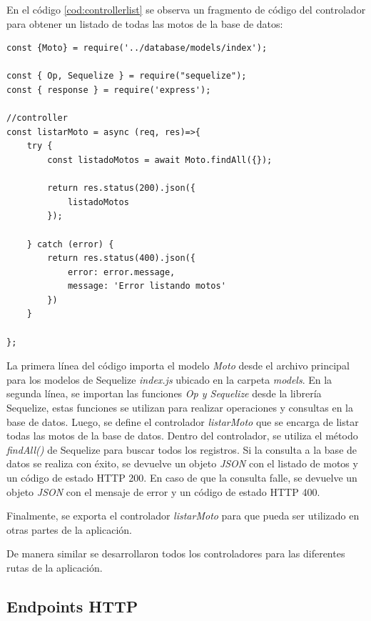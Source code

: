 En el código \ref{cod:controllerlist} se observa un fragmento de código del controlador para obtener un listado de todas las motos de la base de datos:

\begin{lstlisting}[label=cod:controllerlist,caption=Código de controlador para obtener listado de motos.]
const {Moto} = require('../database/models/index');

const { Op, Sequelize } = require("sequelize");
const { response } = require('express');

//controller
const listarMoto = async (req, res)=>{
    try {
        const listadoMotos = await Moto.findAll({});
        
        return res.status(200).json({
            listadoMotos
        }); 

    } catch (error) {
        return res.status(400).json({
            error: error.message,
            message: 'Error listando motos'
        })
    }
    
};
\end{lstlisting}

La primera línea del código importa el modelo \textit{Moto} desde el archivo principal para los modelos de Sequelize \textit{index.js} ubicado en la carpeta \textit{models}. En la segunda línea, se importan las funciones \textit{Op y Sequelize} desde la librería Sequelize, estas funciones se utilizan para realizar operaciones y consultas en la base de datos. Luego, se define el controlador \textit{listarMoto} que se encarga de listar todas las motos de la base de datos. Dentro del controlador, se utiliza el método \textit{findAll()} de Sequelize para buscar todos los registros. Si la consulta a la base de datos se realiza con éxito, se devuelve un objeto \textit{JSON} con el listado de motos y un código de estado HTTP 200. En caso de que la consulta falle, se devuelve un objeto \textit{JSON} con el mensaje de error y un código de estado HTTP 400.

Finalmente, se exporta el controlador \textit{listarMoto} para que pueda ser utilizado en otras partes de la aplicación.

De manera similar se desarrollaron todos los controladores para las diferentes rutas de la aplicación. 

\subsection{Endpoints HTTP}
\label{subsec:apiendpointshttp}

